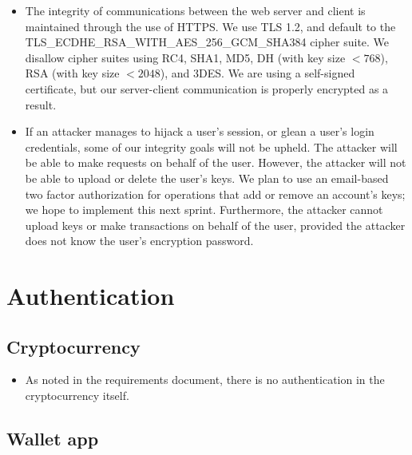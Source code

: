 \documentclass[a4paper,12pt]{article}
\begin{document}
\begin{itemize}
\item The integrity of communications between the web server and client is maintained through the use of HTTPS. We use TLS 1.2, and default to the TLS\_ECDHE\_RSA\_WITH\_AES\_256\_GCM\_SHA384 cipher suite. We disallow cipher suites using RC4, SHA1, MD5, DH (with key size $< 768$), RSA (with key size $< 2048$), and 3DES. We are using a self-signed certificate, but our server-client communication is properly encrypted as a result.
\item If an attacker manages to hijack a user's session, or glean a user's login credentials, some of our integrity goals will not be upheld. The attacker will be able to make requests on behalf of the user. However, the attacker will not be able to upload or delete the user's keys. We plan to use an email-based two factor authorization for operations that add or remove an account's keys; we hope to implement this next sprint. Furthermore, the attacker cannot upload keys or make transactions on behalf of the user, provided the attacker does not know the user's encryption password.
\end{itemize}

\section{Authentication}

\subsection{Cryptocurrency}

\begin{itemize}
\item As noted in the requirements document, there is no authentication in the cryptocurrency itself.
\end{itemize}

\subsection{Wallet app}
\end{document}
